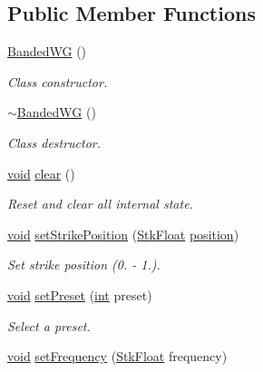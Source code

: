 \subsection*{Public Member Functions}
\begin{DoxyCompactItemize}
\item 
\hyperlink{class_nyq_1_1_banded_w_g_ad52684e2647099059f0ae021f56660d5}{Banded\+WG} ()
\begin{DoxyCompactList}\small\item\em Class constructor. \end{DoxyCompactList}\item 
\hyperlink{class_nyq_1_1_banded_w_g_a92cd523137b33d80f66b8457ab5043d4}{$\sim$\+Banded\+WG} ()
\begin{DoxyCompactList}\small\item\em Class destructor. \end{DoxyCompactList}\item 
\hyperlink{sound_8c_ae35f5844602719cf66324f4de2a658b3}{void} \hyperlink{class_nyq_1_1_banded_w_g_a38551db10292bef9ff406d7b44292f6b}{clear} ()
\begin{DoxyCompactList}\small\item\em Reset and clear all internal state. \end{DoxyCompactList}\item 
\hyperlink{sound_8c_ae35f5844602719cf66324f4de2a658b3}{void} \hyperlink{class_nyq_1_1_banded_w_g_a8ffe349e187f707724efbac3b8a6483a}{set\+Strike\+Position} (\hyperlink{namespace_nyq_a044fa20a706520a617bbbf458a7db7e4}{Stk\+Float} \hyperlink{structposition}{position})
\begin{DoxyCompactList}\small\item\em Set strike position (0. -\/ 1.). \end{DoxyCompactList}\item 
\hyperlink{sound_8c_ae35f5844602719cf66324f4de2a658b3}{void} \hyperlink{class_nyq_1_1_banded_w_g_a3d714c22c57ae0564f8dc0a72f1fb9e7}{set\+Preset} (\hyperlink{xmltok_8h_a5a0d4a5641ce434f1d23533f2b2e6653}{int} preset)
\begin{DoxyCompactList}\small\item\em Select a preset. \end{DoxyCompactList}\item 
\hyperlink{sound_8c_ae35f5844602719cf66324f4de2a658b3}{void} \hyperlink{class_nyq_1_1_banded_w_g_a8e64afb6459f4e6127d34273c9737606}{set\+Frequency} (\hyperlink{namespace_nyq_a044fa20a706520a617bbbf458a7db7e4}{Stk\+Float} frequency)

\end{DoxyCompactItemize}
